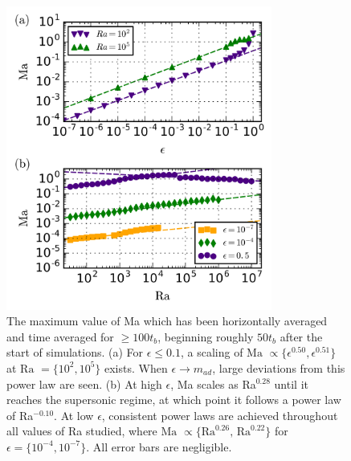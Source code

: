 \documentclass[aps, prl, twocolumn, nofootinbib, groupedaddress, amsfonts, amssymb, amsmath]{revtex4-1}
\begin{document}
\begin{figure}[t]
\includegraphics[width=3.4375in]{./figs/ma_v_eps.png}
\caption{The maximum value of Ma which has been horizontally averaged and time averaged for $\geq 100 t_b$, 
beginning roughly $50t_b$ after
the start of simulations.  (a) For $\epsilon \leq 0.1$,
a scaling of $\text{Ma }\propto \{\epsilon^{0.50}, \epsilon^{0.51}\}$ 
at $\text{Ra }= \{10^2, 10^5\}$ exists.
When $\epsilon \rightarrow m_{ad}$, large deviations from this power law are seen.  
(b) At high $\epsilon$, Ma scales as Ra$^{0.28}$ until it reaches the supersonic regime, at which point it
follows a power law of Ra$^{-0.10}$.  At low $\epsilon$, consistent power laws are achieved throughout all
values of Ra studied, where $\text{Ma }\propto \{\text{Ra}^{0.26},\,\text{Ra}^{0.22}\}$
for $\epsilon = \{10^{-4}, 10^{-7}\}$. All
error bars are negligible.  \label{fig:ma_v_eps} }
\end{figure}
\end{document}
